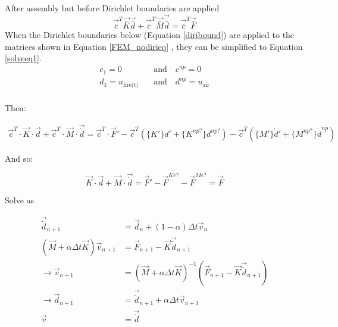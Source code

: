 After assembly but before Dirichlet boundaries are applied 
\begin{equation}\label{FEM_nodirieq}
\vec{\bar{c}}^T \vec{\bar{K}} \vec{\bar{d}} + \vec{\bar{c}}^T \vec{\bar{M}} \vec{\dot{\bar{d}}} = \vec{\bar{c}}^T \vec{\bar{F}}
\end{equation}
When the Dirichlet boundaries below (Equation \ref{diribound}) are applied to the matrices shown in Equation \ref{FEM_nodirieq} , they can be simplified to Equation \ref{solveeq1}.
\begin{equation}\label{diribound}
\begin{aligned}
c_1 = 0 \quad &\text{and} \quad c^{np}=0\\
d_1 = u_{\text{fire(t)}}\quad &\text{and} \quad d^{np} = u_{\text{air}}\\
\end{aligned}
\end{equation}

Then:

\begin{equation}\label{solveeq1}
\begin{aligned}
\vec{c}^T\cdot\vec{K}\cdot\vec{d} + \vec{c}^T\cdot\vec{M}\cdot\vec{\dot{d}} = \vec{c}^T\cdot\vec{F}' - \vec{c}^T\left(
	\{K'\}d'
	+ \{K^{np?}\}d^{np?}
\right)
- \vec{c}^T \left(
	\{M'\}\dot{d}' + \{M^{np?}\}\dot{d}^{np}
\right)
\end{aligned}
\end{equation}


And so:

\begin{equation}\label{solveeq2}
\vec{K}\cdot\vec{d} + \vec{M}\cdot\vec{\dot{d}} = \vec{F}' - \vec{F}^{Ke?} - \vec{F}^{Me?} = \vec{F}
\end{equation}

Solve as

\begin{equation}\label{solveeq3}
\begin{aligned}
\vec{\tilde{d}}_{n+1} &= \vec{d}_n + (1-\alpha)\Delta t \vec{v}_n \\
(\vec{M} + \alpha\Delta t\vec{K})\vec{v}_{n+1} &= \vec{F}_{n+1} - \vec{K} \vec{\tilde{d}}_{n+1} \\
\rightarrow \vec{v}_{n+1} &= (\vec{M} + \alpha\Delta t \vec{K})^{-1} (\vec{F}_{n+1} - \vec{K} \vec{\tilde{d}}_{n+1}) \\
\rightarrow \vec{d}_{n+1} &= \vec{\tilde{d}}_{n+1} + \alpha\Delta t \vec{v}_{n+1} \\
\vec{v} &= \vec{\dot{d}}
\end{aligned}
\end{equation}